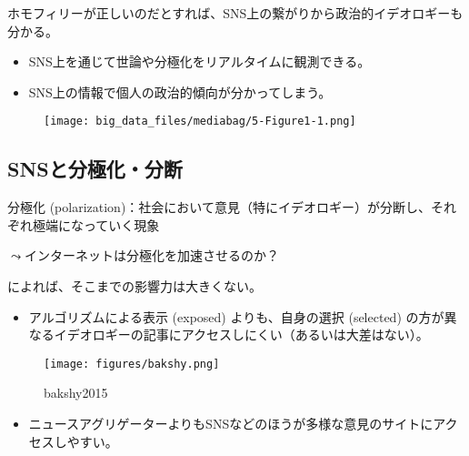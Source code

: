 \documentclass[
  xelatex,
  ja=standard]{bxjsarticle}
\providecommand{\tightlist}{%
  \setlength{\itemsep}{0pt}\setlength{\parskip}{0pt}}\usepackage{longtable,booktabs,array}
\begin{document}
ホモフィリーが正しいのだとすれば、SNS上の繋がりから政治的イデオロギーも分かる。

\begin{itemize}
\tightlist
\item
  SNS上を通じて世論や分極化をリアルタイムに観測できる。
\item
  SNS上の情報で個人の政治的傾向が分かってしまう。
\end{itemize}

\begin{figure}[htpb]

{\centering \texttt{[image: big\_data\_files/mediabag/5-Figure1-1.png]}

}

\caption{\citet{barbera2015}}

\end{figure}

\hypertarget{snsux3068ux5206ux6975ux5316ux5206ux65ad}{%
\subsection{SNSと分極化・分断}\label{snsux3068ux5206ux6975ux5316ux5206ux65ad}}

分極化
(polarization)：社会において意見（特にイデオロギー）が分断し、それぞれ極端になっていく現象

\(\leadsto\)インターネットは分極化を加速させるのか？

\citet[第5章]{inamasu2022}によれば、そこまでの影響力は大きくない。

\begin{itemize}
\tightlist
\item
  アルゴリズムによる表示 (exposed) よりも、自身の選択 (selected)
  の方が異なるイデオロギーの記事にアクセスしにくい（あるいは大差はない）。
\end{itemize}

\begin{figure}[htpb]

{\centering \texttt{[image: figures/bakshy.png]}

}

\caption{bakshy2015}

\end{figure}

\begin{itemize}
\tightlist
\item
  ニュースアグリゲーターよりもSNSなどのほうが多様な意見のサイトにアクセスしやすい。
\end{itemize}
\end{document}
